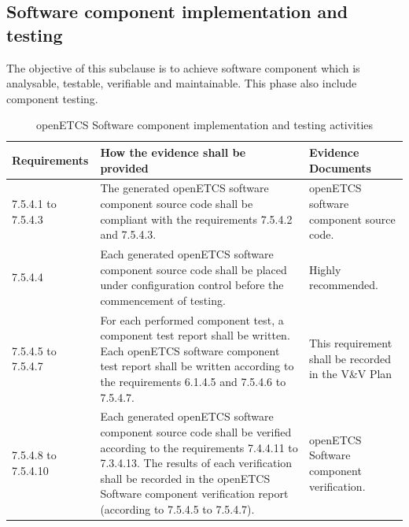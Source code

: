 \documentclass{template/openetcs_report}
\begin{document}
\subsection{Software component implementation and testing}
\begin{flushleft}
The objective of this subclause is to achieve software component which is analysable, testable, verifiable and maintainable. This phase also include component testing.
\end{flushleft}
{\footnotesize\sffamily\centering
\begin{longtable}{|p{2cm}|p{9cm}|p{3cm}|}
\caption{openETCS Software component implementation and testing activities}\\
\hline
\bfseries Requirements & \bfseries How the evidence shall be provided & \bfseries Evidence Documents\\
\hline
\hline
\endhead
\hline
\endfoot

7.5.4.1 to 7.5.4.3 & The generated openETCS software component source code shall be compliant with the requirements 7.5.4.2 and 7.5.4.3.
& openETCS software component source code.\\ 
\hline
7.5.4.4 & Each generated openETCS software component source code shall be placed under configuration control before the commencement of testing.& Highly recommended.\\ 
\hline
7.5.4.5 to 7.5.4.7 & For each performed component test, a component test report shall be written. Each openETCS software component test report shall be written according to the requirements 6.1.4.5 and 7.5.4.6 to 7.5.4.7. & This requirement shall be recorded in the V\&V Plan\\ 
\hline
7.5.4.8 to 7.5.4.10 & Each generated openETCS software component source code shall be verified according to the requirements 7.4.4.11 to 7.3.4.13.
The results of each verification shall be recorded in the openETCS Software component verification report (according to 7.5.4.5 to 7.5.4.7).
& openETCS Software component verification.\\ 
\hline
\end{longtable}}
\end{document}
